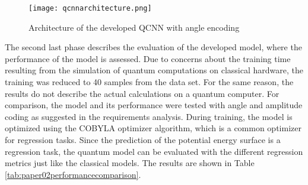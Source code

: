 \begin{figure}[h!]
    \centering
    \texttt{[image: qcnnarchitecture.png]}
    \caption[Architecture of the developed QCNN with angle encoding]{\label{img:qcnnarchitecture}{Architecture of the developed QCNN with angle encoding}}
\end{figure} 

The second last phase describes the evaluation of the developed model, where the performance of the model is assessed. Due to concerns about the training time resulting from the simulation of quantum computations on classical hardware, the training was reduced to 40 samples from the data set. For the same reason, the results do not describe the actual calculations on a quantum computer. For comparison, the model and its performance were tested with angle and amplitude coding as suggested in the requirements analysis. During training, the model is optimized using the COBYLA optimizer algorithm, which is a common optimizer for regression tasks. Since the prediction of the potential energy surface is a regression task, the quantum model can be evaluated with the different regression metrics just like the classical models. The results are shown in Table \ref{tab:paper02performancecomparison}. 

\begin{table}[h!]
    \centering
    \captionsetup{justification=centering}
       \caption[Comparison of performance metrics of the developed model with different data encoding strategies]{\label{tab:paper02performancecomparison} Comparison of performance metrics of the developed model with different data encoding strategies}
\end{table}


